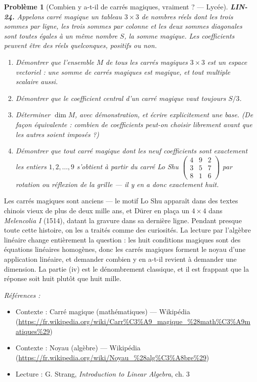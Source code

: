\documentclass[11pt]{article}
\newtheorem{problem}{Problème}
\newenvironment{refs}{\par\small\noindent\emph{Références :}\begin{itemize}\setlength\itemsep{0pt}}{\end{itemize}\normalsize}
\begin{document}
\bigskip

\begin{problem}[{Combien y a-t-il de carrés magiques, vraiment ? --- Lycée}]
\textbf{LIN-24.} Appelons \textit{carré magique} un tableau $3 \times 3$ de nombres réels dont les
trois sommes par ligne, les trois sommes par colonne et les deux sommes diagonales sont toutes égales
à un même nombre $S$, la somme magique. Les coefficients peuvent être des réels quelconques,
positifs ou non.
\begin{enumerate}
\item[(i)] Démontrer que l'ensemble $M$ de tous les carrés magiques $3 \times 3$ est un espace
vectoriel : une somme de carrés magiques est magique, et tout multiple scalaire aussi.
\item[(ii)] Démontrer que le coefficient central d'un carré magique vaut toujours $S/3$.
\item[(iii)] Déterminer $\dim M$, avec démonstration, et écrire explicitement une base. (De façon
équivalente : combien de coefficients peut-on choisir librement avant que les autres soient
imposés ?)
\item[(iv)] Démontrer que tout carré magique dont les neuf coefficients sont exactement les entiers
$1, 2, \dots, 9$ s'obtient à partir du carré Lo Shu
$\begin{pmatrix} 4 & 9 & 2 \\ 3 & 5 & 7 \\ 8 & 1 & 6 \end{pmatrix}$
par rotation ou réflexion de la grille --- il y en a donc exactement huit.
\end{enumerate}

\end{problem}

\noindent Les carrés magiques sont anciens --- le motif Lo Shu apparaît dans des textes chinois
vieux de plus de deux mille ans, et Dürer en plaça un $4 \times 4$ dans \textit{Melencolia I} (1514),
datant la gravure dans sa dernière ligne. Pendant presque toute cette histoire, on les a traités
comme des curiosités. La lecture par l'algèbre linéaire change entièrement la question : les huit
conditions magiques sont des équations linéaires homogènes, donc les carrés magiques forment le
noyau d'une application linéaire, et demander \og{} combien y en a-t-il \fg{} revient à demander une
dimension. La partie (iv) est le dénombrement classique, et il est frappant que la réponse soit huit
plutôt que huit mille.

\begin{refs}
\item Contexte : Carré magique (mathématiques) --- Wikipédia (\url{https://fr.wikipedia.org/wiki/Carr%C3%A9_magique_%28math%C3%A9matiques%29})
\item Contexte : Noyau (algèbre) --- Wikipédia (\url{https://fr.wikipedia.org/wiki/Noyau_%28alg%C3%A8bre%29})
\item Lecture : G. Strang, \textit{Introduction to Linear Algebra}, ch. 3
\end{refs}
\end{document}

